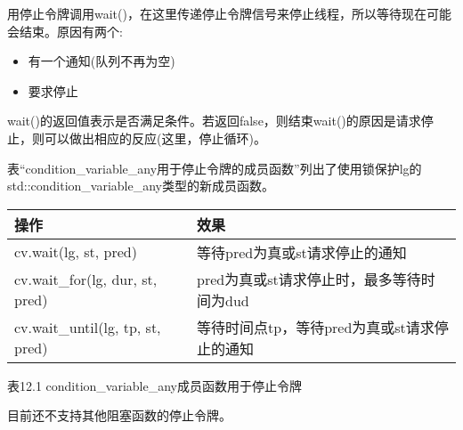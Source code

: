 用停止令牌调用wait()，在这里传递停止令牌信号来停止线程，所以等待现在可能会结束。原因有两个:

\begin{itemize}
\item
有一个通知(队列不再为空)

\item
要求停止
\end{itemize}

wait()的返回值表示是否满足条件。若返回false，则结束wait()的原因是请求停止，则可以做出相应的反应(这里，停止循环)。

表“condition\_variable\_any用于停止令牌的成员函数”列出了使用锁保护lg的std::condition\_variable\_any类型的新成员函数。

\begin{longtable}[c]{|l|l|}
\hline
\textbf{操作} & \textbf{效果} \\ \hline
\endfirsthead
%
\endhead
%
cv.wait(lg, st, pred)            & 等待pred为真或st请求停止的通知                      \\ \hline
cv.wait\_for(lg, dur, st, pred)  & pred为真或st请求停止时，最多等待时间为dud \\ \hline
cv.wait\_until(lg, tp, st, pred) & 等待时间点tp，等待pred为真或st请求停止的通知   \\ \hline
\end{longtable}

\begin{center}
表12.1 condition\_variable\_any成员函数用于停止令牌
\end{center}

目前还不支持其他阻塞函数的停止令牌。






